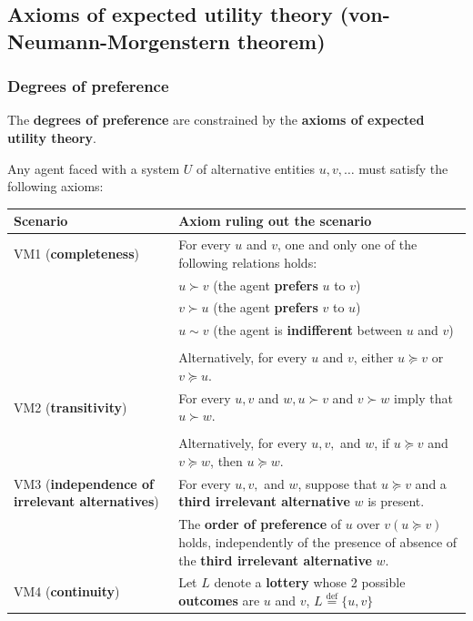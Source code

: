 \documentclass[11pt]{article}
\newcommand{\defequal}{\stackrel{\scriptscriptstyle\mathrm{def}}{=}}
\begin{document}
\subsection{Axioms of expected utility theory (von-Neumann-Morgenstern theorem)}
\label{sec:org0754fac}

\subsubsection{Degrees of preference}
\label{sec:org4384751}
The \textbf{degrees of preference} are constrained by the \textbf{axioms of expected utility theory}.

Any agent faced with a system \(U\) of alternative entities \(u, v, \ldots\) must satisfy the following axioms:
\begin{center}
\begin{tabular}{|m{7em}|m{25em}|}
\hline
Scenario & Axiom ruling out the scenario\\
\hline
VM1 (\textbf{completeness}) & For every \(u\) and \(v\), one and only one of the following relations holds:\\
 & \(u \succ v\) (the agent \textbf{prefers} \(u\) to \(v\))\\
 & \(v \succ u\) (the agent \textbf{prefers} \(v\) to \(u\))\\
 & \(u \sim v\) (the agent is \textbf{indifferent} between \(u\) and \(v\))\\
 & \\
 & Alternatively, for every \(u\) and \(v\), either \(u \succeq v\) or \(v \succeq u\).\\
\hline
VM2 (\textbf{transitivity}) & For every \(u, v\) and \(w, u \succ v\) and \(v \succ w\) imply that \(u \succ w\).\\
 & \\
 & Alternatively, for every \(u, v,\) and \(w\), if \(u \succeq v\) and \(v \succeq w\), then \(u \succeq w\).\\
\hline
VM3 (\textbf{independence of irrelevant alternatives}) & For every \(u, v,\) and \(w\), suppose that \(u \succeq v\) and a \textbf{third irrelevant alternative} \(w\) is present.\\
 & The \textbf{order of preference} of \(u\) over \(v (u \succeq v)\) holds, independently of the presence of absence of the \textbf{third irrelevant alternative} \(w\).\\
\hline
VM4 (\textbf{continuity}) & Let \(L\) denote a \textbf{lottery} whose 2 possible \textbf{outcomes} are \(u\) and \(v\), \(L \defequal \{u, v\}\)\\

\end{tabular}
\end{center}
\end{document}
